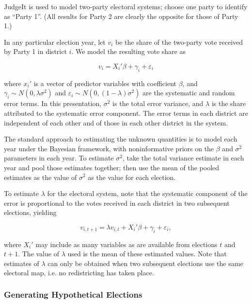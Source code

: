 \documentclass[12pt]{article}
\begin{document}
JudgeIt is used to model two-party electoral systems; choose one party to identify as ``Party 1''. (All results for Party 2 are clearly the opposite for those of Party 1.) 

In any particular election year, let $v_i$ be the share of the two-party vote received by Party 1 in district $i$. We model the resulting vote share as

\[ v_i = X_i'\beta + \gamma_i + \varepsilon_i \]

\noindent where $x_i'$ is a vector of predictor variables with coefficient $\beta$, and $\gamma_i \sim N(0,\lambda \sigma^2)$ and $\varepsilon_i \sim N(0,(1-\lambda) \sigma^2)$ are the systematic and random error terms. In this presentation, $\sigma^2$ is the total error variance, and $\lambda$ is the share attributed to the systematic error component. The error terms in each district are independent of each other and of those in each other district in the system.


The standard approach to estimating the unknown quantities is to model each year under the Bayesian framework, with noninformative priors on the $\beta$ and $\sigma^2$ parameters in each year. To estimate $\sigma^2$, take the total variance estimate in each year and pool those estimates together; then use the mean of the pooled estimates as the value of $\sigma^2$ as the value for each election. 

To estimate $\lambda$ for the electoral system, note that the systematic component of the error is proportional to the votes received in each district in two subsequent elections, yielding \cite{someone}

\[ v_{i,t+1} = \lambda v_{i,t} + X_i'\beta + \gamma_i + \varepsilon_i, \]

\noindent where $X_i'$ may include as many variables as are available from elections $t$ and $t+1$. The value of $\lambda$ used is the mean of these estimated values. Note that estimates of $\lambda$ can only be obtained when two subsequent elections use the same electoral map, i.e. no redistricting has taken place.


\subsubsection*{Generating Hypothetical Elections}
\end{document}
